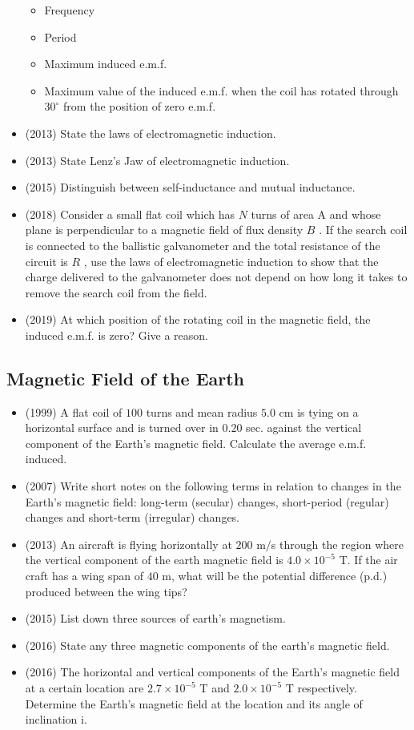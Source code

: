 \documentclass{article}
\begin{document}
\begin{itemize}
 \begin{itemize}
\item Frequency
\item Period
\item Maximum induced e.m.f.
\item Maximum value of the induced e.m.f. when the coil has rotated through $ 30^{\circ}$ from the position of zero e.m.f.
\end{itemize}
\item (2013)  State the laws of electromagnetic induction.
\item (2013)  State Lenz’s Jaw of electromagnetic induction.
\item (2015)  Distinguish between self-inductance and mutual inductance.
\item (2018)  Consider a small flat coil which has $ N$ turns of area A and whose plane is perpendicular to a magnetic field of flux density $ B$ . If the search coil is connected to the ballistic galvanometer and the total resistance of the circuit is $ R$ , use the laws of electromagnetic induction to show that the charge delivered to the galvanometer does not depend on how long it takes to remove the search coil from the field. 
\item (2019)  At which position of the rotating coil in the magnetic field, the induced e.m.f. is zero? Give a reason. 
\end{itemize}

\subsection{Magnetic Field of the Earth}
\begin{itemize}
\item (1999)  A flat coil of $ 100$ turns and mean radius $ 5.0$ cm is tying on a horizontal surface and is turned over in $ 0.20$ sec. against the vertical component of the Earth's magnetic field. Calculate the average e.m.f. induced.
\item (2007)  Write short notes on the following terms in relation to changes in the Earth's magnetic field:  long-term (secular) changes, short-period (regular) changes and short-term (irregular) changes.
\item (2013)  An aircraft is flying horizontally at $ 200$ m$/$s through the region where the vertical component of the earth magnetic field is $ 4.0 \times 10^{-5}$ T. If the air craft has a wing span of $ 40$ m, what will be the potential difference (p.d.) produced between the wing tips? 
\item (2015)  List down three sources of earth's magnetism. 
\item (2016)  State any three magnetic components of the earth’s magnetic field.
\item (2016)  The horizontal and vertical components of the Earth’s magnetic field at a certain location are $ 2.7 \times 10^{-5}$ T and $ 2.0 \times 10^{-5}$ T respectively.  Determine the Earth’s magnetic field at the location and its angle of inclination i.
\end{itemize}
\end{document}

